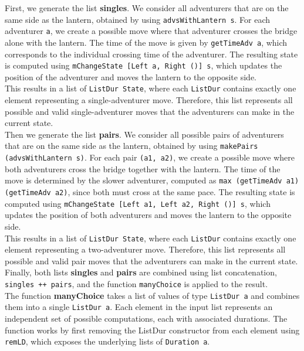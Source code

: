 \documentclass[a4paper,12pt]{report}
\begin{document}
First, we generate the list \textbf{singles}. We
consider all adventurers that are on the same side as the lantern,
obtained by using \texttt{advsWithLantern s}. For each adventurer
\texttt{a}, we create a possible move where that adventurer crosses
the bridge alone with the lantern. The time of the move is given by
\texttt{getTimeAdv a}, which corresponds to the individual crossing time
of the adventurer. The resulting state is computed using
\texttt{mChangeState [Left a, Right ()] s}, which updates the position of
the adventurer and moves the lantern to the opposite side.
\\[1em]
This results in a list of \texttt{ListDur State}, where each
\texttt{ListDur} contains exactly one element representing a
single-adventurer move.
Therefore, this list represents all possible and valid single-adventurer
moves that the adventurers can make in the current state.
\\[1em]
Then we generate the list \textbf{pairs}. We consider all possible
pairs of adventurers that are on the same side as the lantern,
obtained by using \texttt{makePairs (advsWithLantern s)}. For
each pair \texttt{(a1, a2)}, we create a possible move where
both adventurers cross the bridge together with the lantern. The time of
the move is determined by the slower adventurer, computed as 
\texttt{max (getTimeAdv a1) (getTimeAdv a2)}, since both must cross at
the same pace. The resulting state is computed using
\texttt{mChangeState [Left a1, Left a2, Right ()] s}, which updates the
position of both adventurers and moves the lantern to the opposite side.
\\[1em]
This results in a list of \texttt{ListDur State}, where each \texttt{ListDur}
contains exactly one element representing a two-adventurer move. Therefore,
this list represents all possible and valid pair moves that the adventurers
can make in the current state.
\\[1em]
Finally, both lists \textbf{singles} and \textbf{pairs} are combined using
list concatenation, \texttt{singles ++ pairs}, and the function
\texttt{manyChoice} is applied to the result.
\\[1em]
The function \textbf{manyChoice} takes a list of values of
type \texttt{ListDur a} and combines them into a single
\texttt{ListDur a}. Each element in the input list represents an
independent set of possible computations, each with associated durations.
The function works by first removing the ListDur constructor from each element
using \texttt{remLD}, which exposes the underlying lists of \texttt{Duration a}.
\end{document}
